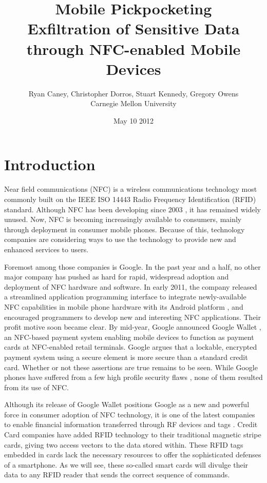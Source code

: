 \documentclass{IEEEtran}
\title{Mobile Pickpocketing \\ \normalsize{Exfiltration of Sensitive Data through NFC-enabled Mobile Devices}}
\author{Ryan Caney, Christopher Dorros, Stuart Kennedy, Gregory Owens \\ Carnegie Mellon University}
\date{May 10 2012}
\begin{document}
\begin{onehalfspace}
\maketitle
\end{onehalfspace} 


\section{Introduction}
Near field communications (NFC) is a wireless communications technology most commonly built on the IEEE ISO 14443 Radio Frequency Identification (RFID) standard.  Although NFC has been developing since 2003 \cite{ecma-nfc-adoption}, it has remained widely unused.  Now, NFC is becoming increasingly available to consumers, mainly through deployment in consumer mobile phones.  Because of this, technology companies are considering ways to use the technology to provide new and enhanced services to users.

Foremost among those companies is Google.  In the past year and a half, no other major company has pushed as hard for rapid, widespread adoption and deployment of NFC hardware and software.  In early 2011, the company released a streamlined application programming interface to integrate newly-available NFC capabilities in mobile phone hardware with its Android platform \cite{nfcworld-nfc-additions-android-2.3.3}, and encouraged programmers to develop new and interesting NFC applications.  Their profit motive soon became clear.  By mid-year, Google announced Google Wallet \cite{google-blog-1}, an NFC-based payment system enabling mobile devices to function as payment cards at NFC-enabled retail terminals.  Google argues \cite{google-wallet-security-1} that a lockable, encrypted payment system using a secure element is more secure than a standard credit card.  Whether or not these assertions are true remains to be seen.  While Google phones have suffered from a few high profile security flaws \cite{esecurityplanet-google-wallet-hacked}, none of them resulted from its use of NFC.

Although its release of Google Wallet positions Google as a new and powerful force in consumer adoption of NFC technology, it is one of the latest companies to enable financial information transferred through RF devices and tags \cite{smartcardaliance-more-visa-paywave}.  Credit Card companies have added RFID technology to their traditional magnetic stripe cards, giving two access vectors to the data stored within.  These RFID tags embedded in cards lack the necessary resources to offer the sophisticated defenses of a smartphone.  As we will see, these so-called smart cards will divulge their data to any RFID reader that sends the correct sequence of commands.    
\end{document}
